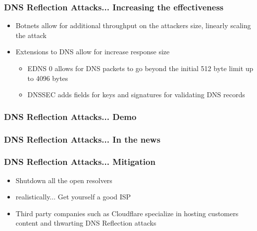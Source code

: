\documentclass{beamer}
\begin{document}
\begin{frame}
	\frametitle{DNS Reflection Attacks... Increasing the effectiveness}
	\begin{itemize}
		\item Botnets allow for additional throughput on the attackers size,
			linearly scaling the attack
		\item Extensions to DNS allow for increase response size
			\begin{itemize}
				\item EDNS 0 allows for DNS packets to go beyond the initial 512 byte
					limit up to 4096 bytes
				\item DNSSEC adds fields for keys and signatures for validating DNS
					records
			\end{itemize}
	\end{itemize}
\end{frame}


\begin{frame}
	\frametitle{DNS Reflection Attacks... Demo}
\end{frame}

\begin{frame}
	\frametitle{DNS Reflection Attacks... In the news}
\end{frame}

\begin{frame}
	\frametitle{DNS Reflection Attacks... Mitigation}
	\begin{itemize}
		\item Shutdown all the open resolvers
			\pause
		\item realistically...
			\pause
			Get yourself a good ISP 
			\pause
		\item Third party companies such as Cloudflare specialize in hosting customers
			content and thwarting DNS Reflection attacks
	\end{itemize}
\end{frame}
\end{document}
